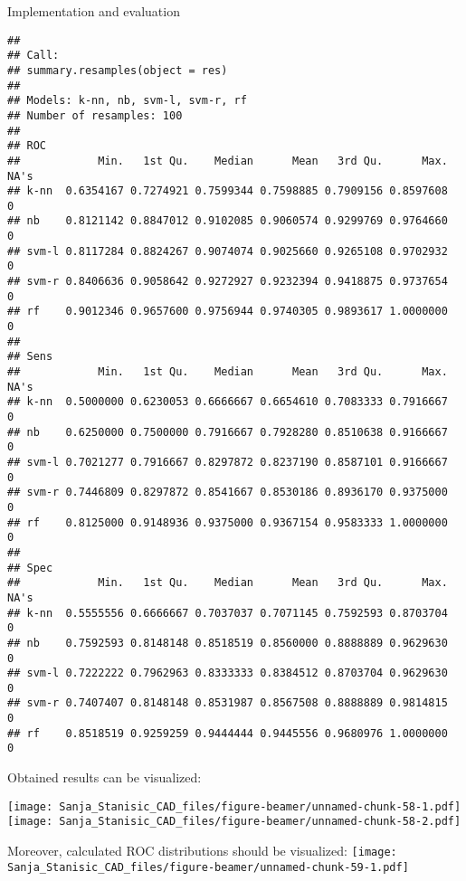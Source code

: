 \documentclass[
  ignorenonframetext,
]{beamer}
\begin{document}
\begin{frame}[fragile]{Implementation and evaluation}
\begin{verbatim}
## 
## Call:
## summary.resamples(object = res)
## 
## Models: k-nn, nb, svm-l, svm-r, rf 
## Number of resamples: 100 
## 
## ROC 
##            Min.   1st Qu.    Median      Mean   3rd Qu.      Max. NA's
## k-nn  0.6354167 0.7274921 0.7599344 0.7598885 0.7909156 0.8597608    0
## nb    0.8121142 0.8847012 0.9102085 0.9060574 0.9299769 0.9764660    0
## svm-l 0.8117284 0.8824267 0.9074074 0.9025660 0.9265108 0.9702932    0
## svm-r 0.8406636 0.9058642 0.9272927 0.9232394 0.9418875 0.9737654    0
## rf    0.9012346 0.9657600 0.9756944 0.9740305 0.9893617 1.0000000    0
## 
## Sens 
##            Min.   1st Qu.    Median      Mean   3rd Qu.      Max. NA's
## k-nn  0.5000000 0.6230053 0.6666667 0.6654610 0.7083333 0.7916667    0
## nb    0.6250000 0.7500000 0.7916667 0.7928280 0.8510638 0.9166667    0
## svm-l 0.7021277 0.7916667 0.8297872 0.8237190 0.8587101 0.9166667    0
## svm-r 0.7446809 0.8297872 0.8541667 0.8530186 0.8936170 0.9375000    0
## rf    0.8125000 0.9148936 0.9375000 0.9367154 0.9583333 1.0000000    0
## 
## Spec 
##            Min.   1st Qu.    Median      Mean   3rd Qu.      Max. NA's
## k-nn  0.5555556 0.6666667 0.7037037 0.7071145 0.7592593 0.8703704    0
## nb    0.7592593 0.8148148 0.8518519 0.8560000 0.8888889 0.9629630    0
## svm-l 0.7222222 0.7962963 0.8333333 0.8384512 0.8703704 0.9629630    0
## svm-r 0.7407407 0.8148148 0.8531987 0.8567508 0.8888889 0.9814815    0
## rf    0.8518519 0.9259259 0.9444444 0.9445556 0.9680976 1.0000000    0
\end{verbatim}

Obtained results can be visualized:

\texttt{[image: Sanja\_Stanisic\_CAD\_files/figure-beamer/unnamed-chunk-58-1.pdf]}
\texttt{[image: Sanja\_Stanisic\_CAD\_files/figure-beamer/unnamed-chunk-58-2.pdf]}

Moreover, calculated ROC distributions should be visualized:
\texttt{[image: Sanja\_Stanisic\_CAD\_files/figure-beamer/unnamed-chunk-59-1.pdf]}

\end{frame}
\end{document}
